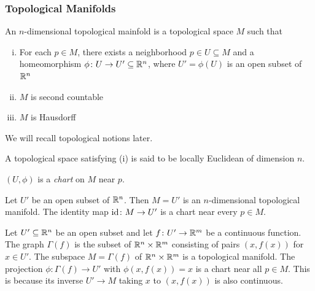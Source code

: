\begin{frame}
  \frametitle{Topological Manifolds}
  \begin{defn}
    An $n$-dimensional topological mainfold is a topological space
    $M$ such that 
    \begin{enumerate}[(i)]
      \item For each $p \in M$, there exists a neighborhood 
        $p \in U \subseteq M$ and a homeomorphism 
        $\phi \colon U \to U' \subseteq \mathbb R^n$,
        where $U' = \phi(U)$ is an open subset of $\mathbb R^n$
      \item $M$ is second countable
      \item $M$ is Hausdorff
    \end{enumerate}
  \end{defn}
  We will recall topological notions later. 

  A topological space satisfying (i)
  is said to be locally Euclidean of dimension $n$.

  $(U, \phi)$ is a {\em chart} on $M$ near $p$.
\end{frame}
\begin{frame}
  \begin{example}
    Let $U'$ be an open subset of $\mathbb R^n$.
    Then $M = U'$ is an $n$-dimensional topological manifold.
    The identity map $\operatorname{id} \colon M \to U'$ is a chart near every $p \in M$.
  \end{example}
  \begin{example}
    Let $U' \subseteq \mathbb R^n$ be an open subset and let $f \colon U' \to \mathbb R^m$
    be a continuous function. The graph $\Gamma(f)$ is the subset of $\mathbb R^n
    \times \mathbb R^m$
    consisting of pairs $(x, f(x))$ for $x \in U'$. 
    The subspace $M = \Gamma(f)$ of $\mathbb R^n \times \mathbb R^m$
    is a topological manifold. The projection
    $\phi \colon \Gamma(f) \to U'$
    with $\phi(x, f(x)) = x$ is a chart near all $p \in M$.
    This is because its inverse $U' \to M$ taking $x$ to $(x, f(x))$
    is also continuous.
  \end{example}
\end{frame}
